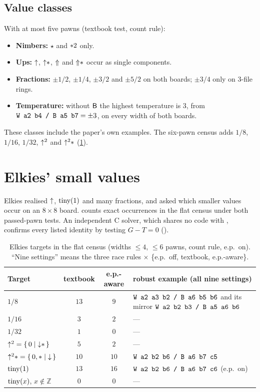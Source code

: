 \subsection{Value classes}
With at most five pawns (textbook test, count rule):
\begin{itemize}
\item \textbf{Nimbers:} $\star$ and $\mathord{\ast 2}$ only.
\item \textbf{Ups:} $\mathord{\uparrow}$, $\mathord{\uparrow}\mathord{\ast}$, $\mathord{\Uparrow}$ and $\mathord{\Uparrow}\mathord{\ast}$ occur as single components.
\item \textbf{Fractions:} $\pm1/2$, $\pm1/4$, $\pm3/2$ and $\pm5/2$ on both boards; $\pm3/4$ only on $3$-file rings.
\item \textbf{Temperature:} without $\mathsf{B}$ the highest temperature is $3$, from $\texttt{W a2 b4 / B a5 b7}=\pm3$,
  on every width of both boards.
\end{itemize}
These classes include the paper's own examples. The six-pawn census adds $1/8$, $1/16$, $1/32$, $\mathord{\uparrow^{2}}$ and
$\mathord{\uparrow^{2}}\mathord{\ast}$ (\cref{sec:targets}).

\section{Elkies' small values}\label{sec:targets}

Elkies realised $\mathord{\uparrow}$, $\operatorname{tiny}(1)$ and many fractions, and asked which smaller values occur on an $8\times8$
board.  counts exact occurrences in the flat census under both passed-pawn tests. An
independent C solver, which shares no code with , confirms every listed identity by testing
$G-T=0$ ().

\begin{table}[ht]
\centering\small
\begin{tabular}{@{}lccl@{}}
\toprule
Target & textbook & e.p.-aware & robust example (all nine settings) \\
\midrule
$1/8$ & $13$ & $9$ & $\texttt{W a2 a3 b2 / B a6 b5 b6}$ and its mirror $\texttt{W a2 b2 b3 / B a5 a6 b6}$ \\
$1/16$ & $3$ & $2$ & --- \\
$1/32$ & $1$ & $0$ & --- \\
$\mathord{\uparrow^{2}}=\{\,0 \mid \mathord{\downarrow}\mathord{\ast}\,\}$ & $5$ & $2$ & --- \\
$\mathord{\uparrow^{2}}\mathord{\ast}=\{\,0,\mathord{\ast} \mid \mathord{\downarrow}\,\}$ & $10$ & $10$ & $\texttt{W a2 b2 b6 / B a6 b7 c5}$ \\
$\operatorname{tiny}(1)$ & $13$ & $16$ & $\texttt{W a2 b2 b6 / B a6 b7 c6}$ (e.p.\ on) \\
$\operatorname{tiny}(x)$, $x\notin\mathbb{Z}$ & $0$ & $0$ & --- \\
\bottomrule
\end{tabular}
\caption{Elkies targets in the flat census (widths $\le4$, $\le6$ pawns, count rule, e.p.\ on). ``Nine
settings'' means the three race rules $\times$ \{e.p.\ off, textbook, e.p.-aware\}.}
\label{tab:targets}
\end{table}

